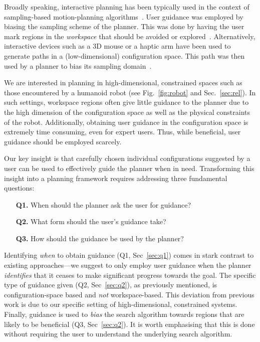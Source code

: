 \documentclass[conference]{IEEEtran}
\begin{document}
Broadly speaking, interactive planning has been typically used in the context of sampling-based motion-planning algorithms~\cite{L06}.
User guidance was employed by biasing the sampling scheme of the planner.
This was done by having the user mark regions in the \emph{workspace} that should be avoided or 
explored~\cite{DSJA14, MTMKDC15, YPB15}.
Alternatively, interactive devices such as a 3D mouse or a haptic arm have been used to generate paths in a (low-dimensional) configuration space. This path was then used by a planner to bias its 
sampling domain~\cite{BTFF16, FTF09, TFF12}.

We are interested in planning in high-dimensional, constrained spaces such as those encountered by a humanoid robot (see Fig.~\ref{fig:robot} and Sec.~\ref{sec:rel}).
In such settings, workspace regions often give little guidance to the planner due to the high dimension of the configuration space as well as the physical constraints of the robot.
Additionally, obtaining user guidance in the configuration space is extremely time consuming, even for expert users.
Thus,  while beneficial, user guidance should be employed scarcely.

Our key insight is that carefully chosen individual configurations suggested by a user can be used to effectively guide the planner when in need.
Transforming this insight into a planning framework requires addressing three fundamental questions:

\begin{itemize}
	\item[\textbf{Q1.}] When should the planner ask the user for guidance?
	\item[\textbf{Q2.}] What form should the user's guidance take?
	\item[\textbf{Q3.}] How should the guidance be used by the planner?
\end{itemize}

Identifying \emph{when} to obtain guidance 
(Q1, Sec~\ref{sec:q1}) 
comes in stark contrast to existing approaches---we suggest to only employ user guidance when the planner \emph{identifies} that it ceases to make significant progress towards the goal.
The specific type of guidance given 
(Q2, Sec~\ref{sec:q2}),
as previously mentioned,
is configuration-space based and \emph{not} workspace-based. This deviation from previous work is due to our specific setting of high-dimensional, constrained systems.
Finally, guidance is used to \emph{bias} the search algorithm towards regions that are likely to be beneficial (Q3, Sec~\ref{sec:q2}). 
It is worth emphasising that this is done without requiring the user to understand the underlying search algorithm. 
\end{document}
